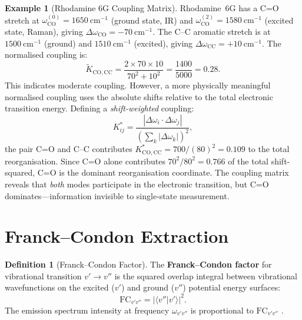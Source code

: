 \documentclass[11pt,twocolumn,a4paper]{article}
\theoremstyle{definition}
\newtheorem{definition}[theorem]{Definition}
\newtheorem{example}[theorem]{Example}
\theoremstyle{remark}
\begin{document}
\begin{example}[Rhodamine 6G Coupling Matrix]
\label{ex:rhodamine_coupling}
Rhodamine~6G has a C=O stretch at $\omega^{(0)}_{\mathrm{CO}} = 1650~\mathrm{cm}^{-1}$ (ground state, IR) and $\omega^{(2)}_{\mathrm{CO}} = 1580~\mathrm{cm}^{-1}$ (excited state, Raman), giving $\Delta\omega_{\mathrm{CO}} = -70~\mathrm{cm}^{-1}$. The C--C aromatic stretch is at $1500~\mathrm{cm}^{-1}$ (ground) and $1510~\mathrm{cm}^{-1}$ (excited), giving $\Delta\omega_{\mathrm{CC}} = +10~\mathrm{cm}^{-1}$. The normalised coupling is:
\begin{equation}
\tilde{K}_{\mathrm{CO,CC}} = \frac{2 \times 70 \times 10}{70^2 + 10^2} = \frac{1400}{5000} = 0.28.
\end{equation}
This indicates moderate coupling. However, a more physically meaningful normalised coupling uses the absolute shifts relative to the total electronic transition energy. Defining a \emph{shift-weighted} coupling:
\begin{equation}
K^*_{ij} = \frac{|\Delta\omega_i \cdot \Delta\omega_j|}{(\sum_k |\Delta\omega_k|)^2},
\end{equation}
the pair C=O and C--C contributes $K^*_{\mathrm{CO,CC}} = 700/(80)^2 = 0.109$ to the total reorganisation. Since C=O alone contributes $70^2/80^2 = 0.766$ of the total shift-squared, C=O is the dominant reorganisation coordinate. The coupling matrix reveals that \emph{both} modes participate in the electronic transition, but C=O dominates---information invisible to single-state measurement.
\end{example}

\section{Franck--Condon Extraction}
\label{sec:fc}

\begin{definition}[Franck--Condon Factor]
\label{def:fc}
The \textbf{Franck--Condon factor} for vibrational transition $v' \to v''$ is the squared overlap integral between vibrational wavefunctions on the excited ($v'$) and ground ($v''$) potential energy surfaces:
\begin{equation}
\mathrm{FC}_{v'v''} = |\langle v'' | v' \rangle|^2.
\end{equation}
The emission spectrum intensity at frequency $\omega_{v'v''}$ is proportional to $\mathrm{FC}_{v'v''}$ \citep{franck1926, condon1928}.
\end{definition}
\end{document}
